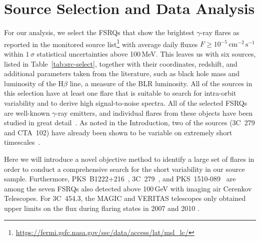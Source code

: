 \documentclass[twocolumn]{aastex62}
\newcommand{\gray}{$\gamma$-ray\xspace}
\begin{document}
\section{Source Selection and Data Analysis}
\label{sec:data}

For our analysis, we select the FSRQs that show the brightest \gray flares as reported in the monitored source list\footnote{\url{https://fermi.gsfc.nasa.gov/ssc/data/access/lat/msl_lc/}}
with average daily fluxes $F \geqslant 10^{-5}\,\mathrm{cm}^{-2}\,\mathrm{s}^{-1}$ within $1\,\sigma$ statistical uncertainties above 100\,MeV.
This leaves us with six sources, listed in Table~\ref{tab:src-select}, together with their coordinates, redshift, and additional parameters taken from the literature, such as black hole mass and luminosity of the $\mathrm{H}\beta$ line, a measure of the BLR luminosity.  
All of the sources in this selection have at least one 
flare that is suitable
to search for intra-orbit variability and to derive high signal-to-noise spectra. 
All of the selected FSRQs are well-known \gray emitters, and individual flares from these objects have been studied in great detail~\citep[e.g.,][]{2010ApJ...714L..73A,2011ApJ...733...19T,2015ApJ...808L..48P,TheFermi-LAT:2016dss,2013ApJ...766L..11S,2015ApJ...809..164D,2018ApJ...854L..26S,2018A&A...617A..59K,2019ApJ...871...19Z,2011ApJ...733L..26A}. 
As noted in the Introduction, two of the sources (3C~279 and CTA~102) have already been shown to be variable on extremely short timescales~\citep{TheFermi-LAT:2016dss,2018ApJ...854L..26S}. 

Here we will introduce a novel objective method to identify a large set of flares in order to conduct a comprehensive search for the short variability in our source sample.  
Furthermore, PKS~B1222+216~\citep{2011ApJ...730L...8A}, 3C~279~\citep{2008Sci...320.1752M}, and PKS~1510-089~\citep{2011ApJ...730L...8A,2013A&A...554A.107H,2014A&A...569A..46A}  are among the seven FSRQs also detected above 100\,GeV with imaging air Cerenkov Telescopes. 
For 3C~454.3, the MAGIC and VERITAS telescopes only obtained upper limits on the flux during flaring states in 2007 \citep{2009A&A...498...83A} and 2010 \citep{2016AJ....151..142A}.
\end{document}
